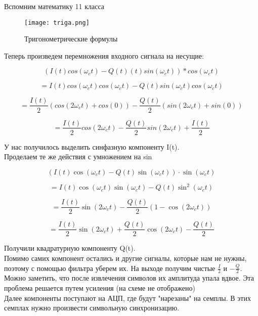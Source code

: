 Вспомним математику 11 класса 

\begin{figure}[H]
    \centering
    \texttt{[image: triga.png]}
    \caption{Тригонометрические формулы}
\end{figure}

Теперь произведем перемножения входного сигнала на несущие:


$$(I(t)cos(\omega_ct)-Q(t)(t)sin(\omega_ct)) * cos(\omega_ct)$$

$$= I(t)cos(\omega_ct)cos(\omega_ct) - Q(t)sin(\omega_ct)cos(\omega_ct)$$

$$= \frac{I(t)}{2}(cos(2\omega_ct) + cos(0)) - \frac{Q(t)}{2}(sin(2\omega_ct) + sin(0))$$

$$= \frac{I(t)}{2}cos(2\omega_ct) - \frac{Q(t)}{2}sin(2\omega_ct) + \boxed{\frac{I(t)}{2}}$$

У нас получилось выделить синфазную компоненту I(t). \\

Проделаем те же действия с умножением на sin

\[
(I(t)\cos(\omega_c t) - Q(t)\sin(\omega_c t)) \cdot \sin(\omega_c t)
\]

\[
= I(t)\cos(\omega_c t)\sin(\omega_c t) - Q(t)\sin^2(\omega_c t)
\]

\[
= \frac{I(t)}{2}\sin(2\omega_c t) - \frac{Q(t)}{2}(1 - \cos(2\omega_c t))
\]

\[
= \frac{I(t)}{2}\sin(2\omega_c t) + \frac{Q(t)}{2}\cos(2\omega_c t) - \boxed{\frac{Q(t)}{2}}
\]

Получили квадратурную компоненту Q(t). \\


Помимо самих компонент остались и другие сигналы, которые нам не нужны, поэтому с помощью фильтра уберем их. На выходе получим чистые
$\frac{I}{2}$ и $-\frac{Q}{2}$. Можно заметить, что после извлечения символов их амплитуда упала вдвое. Эта проблема решается
путем усиления (на схеме не отображено)\\

Далее компоненты поступают на АЦП, где будут "нарезаны" на семплы. В этих семплах нужно произвести символьную синхронизацию.

\endinput


